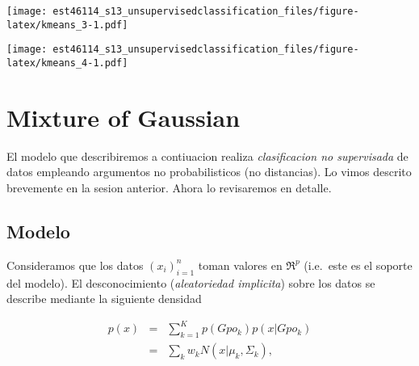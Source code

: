 \documentclass[11pt,]{article}
\newenvironment{Shaded}{\begin{snugshade}}{\end{snugshade}}
\newcommand{\KeywordTok}[1]{\textcolor[rgb]{0.13,0.29,0.53}{\textbf{#1}}}
\newcommand{\DataTypeTok}[1]{\textcolor[rgb]{0.13,0.29,0.53}{#1}}
\newcommand{\DecValTok}[1]{\textcolor[rgb]{0.00,0.00,0.81}{#1}}
\newcommand{\StringTok}[1]{\textcolor[rgb]{0.31,0.60,0.02}{#1}}
\newcommand{\OperatorTok}[1]{\textcolor[rgb]{0.81,0.36,0.00}{\textbf{#1}}}
\newcommand{\NormalTok}[1]{#1}
\begin{document}
\texttt{[image: est46114\_s13\_unsupervisedclassification\_files/figure-latex/kmeans\_3-1.pdf]}

\begin{Shaded}
\end{Shaded}

\texttt{[image: est46114\_s13\_unsupervisedclassification\_files/figure-latex/kmeans\_4-1.pdf]}

\section{Mixture of Gaussian}\label{mixture-of-gaussian}

El modelo que describiremos a contiuacion realiza \emph{clasificacion no
supervisada} de datos empleando argumentos no probabilisticos (no
distancias). Lo vimos descrito brevemente en la sesion anterior. Ahora
lo revisaremos en detalle.

\subsection{Modelo}\label{modelo}

Consideramos que los datos \((x_i)_{i=1}^{n}\) toman valores en
\(\Re^p\) (i.e.~este es el soporte del modelo). El desconocimiento
(\emph{aleatoriedad implicita}) sobre los datos se describe mediante la
siguiente densidad

\begin{eqnarray}
p(x) & = & \sum_{k=1}^{K} p(Gpo_{k})p(x|Gpo_{k}) \\
     & = & \sum_{k} w_{k}N(x|\mu_k,\Sigma_k),
\end{eqnarray}
\end{document}
